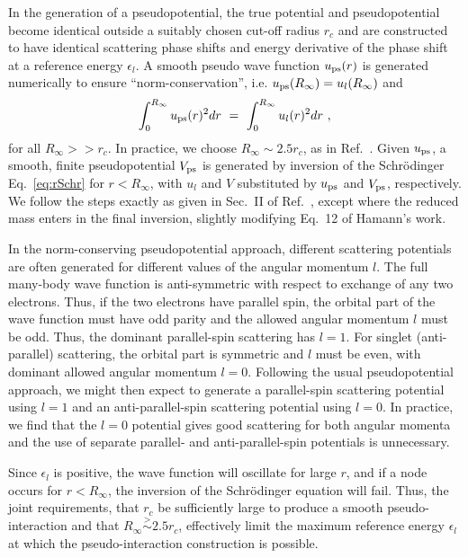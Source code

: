 In the generation of a pseudopotential, the true potential and
pseudopotential become identical outside a suitably chosen cut-off 
radius $r_c$ and are constructed to have identical scattering phase 
shifts and energy derivative of the phase shift at a reference 
energy $\epsilon_l$.
A smooth pseudo wave function $u_{\rm ps}(r)$ is generated numerically
to ensure ``norm-conservation'', 
i.e. $u_{\rm ps}(R_\infty) = u_l(R_\infty)$ and
\begin{eqnarray}
\int_0^{R_\infty} u_{\rm ps}(r)^2 dr ~= ~\int_0^{R_\infty} u_l(r)^2 dr ~,
 \label{eq:norm}
\end{eqnarray}
for all $R_\infty >> r_c$.
In practice, we choose $R_\infty \sim 2.5 r_c$, as in 
Ref.~\cite{Hamann:gncpp}.
Given $u_{\rm ps}$, a smooth, finite pseudopotential $V_{\rm ps}$ 
is generated by inversion of the Schr\"odinger Eq.~\ref{eq:rSchr} 
for $r<R_\infty$, with $u_l$ and $V$ substituted by $u_{\rm ps}$ 
and $V_{\rm ps}$, respectively.
We follow the steps exactly as given in Sec.~II of 
Ref.~\cite{Hamann:gncpp}, except where the reduced mass enters
in the final inversion, slightly modifying Eq.~12 of Hamann's work. 

In the norm-conserving pseudopotential approach, different
scattering potentials are often generated for different values of
the angular momentum $l$.
The full many-body wave function is anti-symmetric with respect to
exchange of any two electrons. 
Thus, if the two electrons have parallel spin, the orbital part of 
the wave function must have odd parity and the allowed angular 
momentum $l$ must be odd.
Thus, the dominant parallel-spin scattering has $l=1$.
For singlet (anti-parallel) scattering, the orbital part is 
symmetric and $l$ must be even, with dominant allowed angular momentum 
$l=0$.
Following the usual pseudopotential approach, we might then expect 
to generate a parallel-spin scattering potential using $l=1$ and an
anti-parallel-spin scattering potential using $l=0$. 
In practice, we find that the $l=0$ potential gives good scattering 
for both angular momenta and the use of separate parallel- and 
anti-parallel-spin potentials is unnecessary.

Since $\epsilon_l$ is positive, the wave function will oscillate
for large $r$, and if a node occurs for $r<R_{\infty}$, 
the inversion of the Schr\"{o}dinger equation will fail. 
Thus, the joint requirements,
that $r_c$ be sufficiently large to produce a smooth 
pseudo-interaction and that $R_{\infty} \stackrel{>}{\sim} 2.5 r_c$,
effectively limit the maximum reference energy $\epsilon_l$ at 
which the pseudo-interaction construction is possible.

